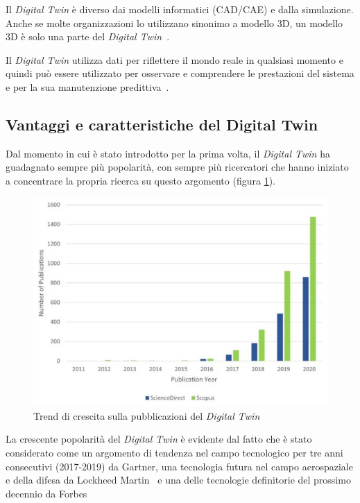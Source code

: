 Il \emph{Digital Twin} è diverso dai modelli informatici (CAD/CAE) e dalla simulazione. Anche se molte organizzazioni lo utilizzano sinonimo a modello 3D, un modello 3D è solo una parte del \emph{Digital Twin}~\cite{Culla}.

Il \emph{Digital Twin} utilizza dati per riflettere il mondo reale in qualsiasi momento e quindi può essere utilizzato per osservare e comprendere le prestazioni del sistema e per la sua manutenzione predittiva~\cite{Sofisticazione}.

\newpage

\subsection{Vantaggi e caratteristiche del Digital Twin}
Dal momento in cui è stato introdotto per la prima volta, il \emph{Digital Twin} ha guadagnato sempre più popolarità, con sempre più ricercatori che hanno iniziato a concentrare la propria ricerca su questo argomento (figura \ref{fig:crescita_pubblicazioni}).

\begin{figure}[h]
\begin{center}
\includegraphics[width=12cm]{images/Pubblicazione_DT.jpg}
\caption[Grafico pubblicazione Digital Twin]{Trend di crescita sulla pubblicazioni del \emph{Digital Twin}~\cite{Researchgate}}\label{fig:crescita_pubblicazioni}
\end{center}
\end{figure}

La crescente popolarità del \emph{Digital Twin} è evidente dal fatto che è stato considerato come un argomento di tendenza nel campo tecnologico per tre anni consecutivi (2017-2019) da Gartner\cite{Gartner2017, Gartner2018, Gartner2019}, una tecnologia futura nel campo aerospaziale e della difesa da Lockheed Martin~\cite{Martin} e una delle tecnologie definitorie del prossimo decennio da Forbes~\cite{Forbes}

